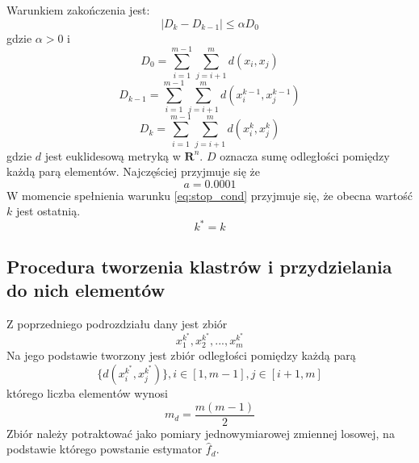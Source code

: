 Warunkiem zakończenia jest:
\begin{equation} \label{eq:stop_cond}
|D_k-D_{k-1}| \leq \alpha D_0
\end{equation}
gdzie $\alpha>0$ i 
\begin{equation}
D_0 = \displaystyle\sum_{i=1}^{m-1} \displaystyle\sum_{j=i+1}^{m} d(x_i, x_j)
\end{equation}
\begin{equation}
D_{k-1} = \displaystyle\sum_{i=1}^{m-1} \displaystyle\sum_{j=i+1}^{m} d(x_i^{k-1}, x_j^{k-1})
\end{equation}
\begin{equation}
D_{k} = \displaystyle\sum_{i=1}^{m-1} \displaystyle\sum_{j=i+1}^{m} d(x_i^{k}, x_j^{k})
\end{equation}
gdzie $d$ jest euklidesową metryką w $\mathbf{R}^n$. $D$ oznacza sumę odległości pomiędzy każdą parą elementów. Najczęściej przyjmuje się że
\begin{equation}
a= 0.0001
\end{equation}
W momencie spełnienia warunku \eqref{eq:stop_cond} przyjmuje się, że obecna wartość $k$ jest ostatnią.
\begin{equation}
k^*=k
\end{equation}

\subsection{Procedura tworzenia klastrów i przydzielania do nich elementów}
\label{subsec:tworzenie_klastrow}
Z poprzedniego podrozdziału dany jest zbiór
\begin{equation} \label{eq:set_init}
x^{k^*}_1, x^{k^*}_2, ..., x^{k^*}_m 
\end{equation}
Na jego podstawie tworzony jest zbiór odległości pomiędzy każdą parą
\begin{equation} \label{eq:set_x_k}
\{ d(x^{k^*}_i, x^{k^*}_j) \}, i \in [1, m-1], j \in [i+1,m]
\end{equation}
którego liczba elementów wynosi
\begin{equation}
m_d=\frac{m(m-1)}{2}
\end{equation}
Zbiór należy potraktować jako pomiary jednowymiarowej zmiennej losowej, na podstawie którego powstanie estymator $\hat{f}_d$.

